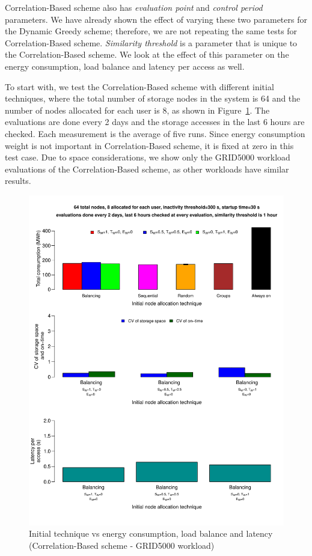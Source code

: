 Correlation-Based scheme also has \textit{evaluation point} and \textit{control period} parameters. We have
already shown the effect of varying these two parameters for the Dynamic Greedy scheme; therefore, we are not
repeating the same tests for Correlation-Based scheme. \textit{Similarity threshold} is a parameter that
is unique to the Correlation-Based scheme. We look at the effect of this parameter on the energy consumption,
load balance and latency per access as well.

To start with, we test the Correlation-Based scheme with different initial techniques, where the total number of
storage nodes in the system is 64 and the number of nodes allocated for each user is 8, as shown in 
Figure~\ref{seventhresult}. The evaluations are done every 2 days and the storage accesses in the last 6 hours
are checked. Each measurement is the average of five runs. Since energy consumption weight is not important
in Correlation-Based scheme, it is fixed at zero in this test case. Due to space considerations, we
show only the GRID5000 workload evaluations of the Correlation-Based scheme, as other workloads have similar
results.

\begin{figure}[!htbp]
\centering
\includegraphics[width=\columnwidth,keepaspectratio]{FIG12.pdf}
\caption{Initial technique vs energy consumption, load balance and latency (Correlation-Based scheme -
 GRID5000 workload)}
\label{seventhresult}
\end{figure}

